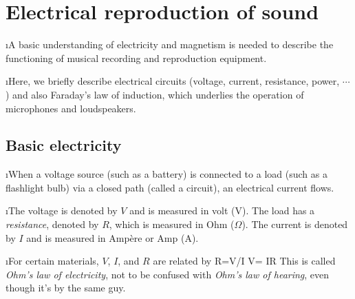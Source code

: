 \section{Electrical reproduction of sound}

\bi
\i A basic understanding of electricity and magnetism is 
needed to describe the functioning of musical recording 
and reproduction equipment.

\i Here, we briefly describe electrical circuits (voltage, current,
resistance, power, $\cdots$) and also Faraday's law of induction, 
which underlies the operation of microphones and loudspeakers.

\ei

\subsection{Basic electricity}

\bi

\i When a voltage source (such as a battery) is connected to a 
load (such as a flashlight bulb) via a closed path (called a
circuit), an electrical current flows.

\i The voltage is denoted by $V$ and is measured in volt (V).
The load has a {\em resistance}, denoted by $R$, which is 
measured in Ohm ($\Omega$).
The current is denoted by $I$ and is measured in Amp\`ere or 
Amp (A).

\i For certain materials, $V$, $I$, and $R$ are related by 
%
\be
R=V/I\quad 
V= IR
\ee
%
This is called {\em Ohm's law of electricity}, not to be confused
with {\em Ohm's law of hearing}, even though it's by the same guy.

